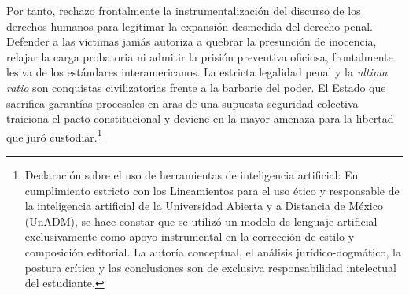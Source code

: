 \documentclass[12pt,spanish,letterpaper,oneside]{article}
\begin{document}
Por tanto, rechazo frontalmente la instrumentalizaci\'on del discurso de los derechos humanos para legitimar la expansi\'on desmedida del derecho penal. Defender a las v\'ictimas jam\'as autoriza a quebrar la presunci\'on de inocencia, relajar la carga probatoria ni admitir la prisi\'on preventiva oficiosa, frontalmente lesiva de los est\'andares interamericanos. La estricta legalidad penal y la \emph{ultima ratio} son conquistas civilizatorias frente a la barbarie del poder. El Estado que sacrifica garant\'ias procesales en aras de una supuesta seguridad colectiva traiciona el pacto constitucional y deviene en la mayor amenaza para la libertad que jur\'o custodiar.\footnote{Declaraci\'on sobre el uso de herramientas de inteligencia artificial: En cumplimiento estricto con los Lineamientos para el uso \'etico y responsable de la inteligencia artificial de la Universidad Abierta y a Distancia de M\'exico (UnADM), se hace constar que se utiliz\'o un modelo de lenguaje artificial exclusivamente como apoyo instrumental en la correcci\'on de estilo y composici\'on editorial. La autor\'ia conceptual, el an\'alisis jur\'idico-dogm\'atico, la postura cr\'itica y las conclusiones son de exclusiva responsabilidad intelectual del estudiante.}
\end{document}
